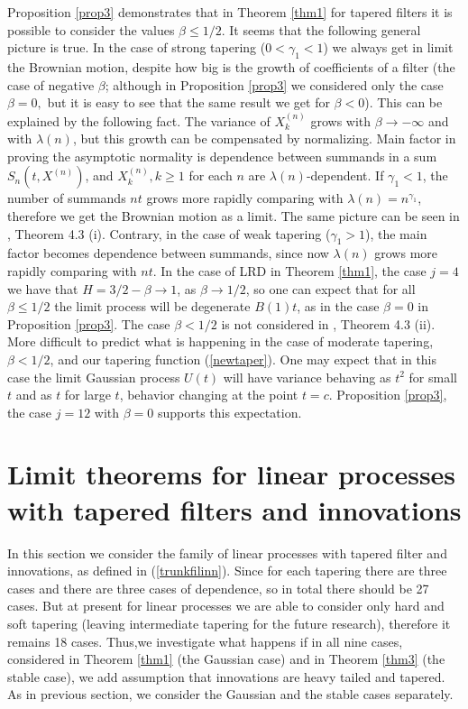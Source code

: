 \documentclass[12pt]{article}
\def\b{\beta}
\def\g{\gamma}
\def\l{\lambda}
\theoremstyle{plain}
\theoremstyle{definition}
\begin{document}
 Proposition \ref{prop3} demonstrates that in Theorem \ref{thm1} for tapered filters it is possible to consider the values $\b\le 1/2$. It seems that the following general picture is true. In the case of strong tapering ($0<\g_1<1$) we always get in limit the Brownian motion, despite how big is the growth of  coefficients of a filter (the case of negative $\b$; although in Proposition \ref{prop3} we considered only the case $\b=0,$ but it is easy to see that the same result we get for $\b<0$). This can be explained by the following fact. The variance of $X_k^{(n)}$ grows with  $\b\to -\infty$ and with $\l(n)$, but this growth can be compensated by normalizing. Main factor in proving the asymptotic normality is dependence between summands in a sum $S_n(t, X^{(n)})$, and $X_k^{(n)}, k\ge 1$ for each $n$ are $\l(n)$-dependent. If $\g_1<1$, the number of summands $nt$ grows more rapidly comparing with $\l(n)=n^{\g_1}$, therefore we  get the Brownian motion  as a limit. The same picture can be seen in \cite{Sabzikar}, Theorem 4.3 (i). Contrary, in the case of weak tapering ($\g_1>1$), the main factor becomes dependence between summands, since now $\l(n)$ grows more rapidly comparing with $nt$. In the case of LRD in Theorem \ref{thm1}, the case $j=4$ we have that $H=3/2-\b \to 1$, as $\b\to 1/2$, so one can expect that for all $\b\le 1/2$ the limit process will be degenerate $B(1)t$, as in the case $\b=0$ in Proposition \ref{prop3}. The case $\b<1/2$ is not considered in \cite{Sabzikar}, Theorem 4.3 (ii). More difficult to predict what is happening in the case of moderate tapering,  $\b<1/2$, and our tapering function (\ref{newtaper}).
One may expect that in this case  the limit Gaussian process $U(t)$ will have variance behaving as $t^{2}$ for small $t$ and as $t$ for large $t$, behavior changing at the point $t=c$. Proposition \ref{prop3}, the case $j=12$ with $\b=0$ supports this expectation.



\bigskip

\section{Limit theorems for linear processes with tapered filters and innovations}\label{sec2}

In this section we consider the family of linear processes with tapered filter and innovations, as defined in (\ref{trunkfilinn}). Since for each  tapering there are three cases and there are three cases of dependence, so in total there should be 27 cases. But at  present for linear processes we are able to consider only  hard and soft tapering (leaving intermediate tapering for the future research), therefore it remains 18 cases. Thus,we investigate what happens if in all nine cases, considered in Theorem \ref{thm1} (the Gaussian case) and in Theorem \ref{thm3} (the stable case), we add assumption that innovations are heavy tailed and tapered. As in previous section, we consider the Gaussian and the stable cases separately.
\end{document}
